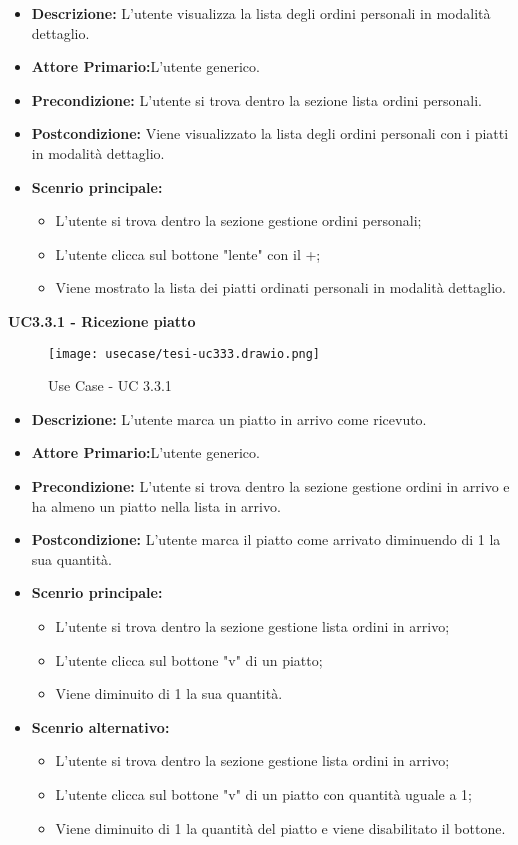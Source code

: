 \begin{itemize}
    \item \textbf{Descrizione:} L'utente visualizza la lista degli ordini personali in modalità dettaglio.
    \item \textbf{Attore Primario:}L'utente generico.
    \item \textbf{Precondizione:} L'utente si trova dentro la sezione lista ordini personali.
    \item \textbf{Postcondizione:} Viene visualizzato la lista degli ordini personali con i piatti in modalità dettaglio.
    \item \textbf{Scenrio principale:}
    \begin{itemize}
        \item L'utente si trova dentro la sezione gestione ordini personali;
        \item L'utente clicca sul bottone "lente" con il +;
        \item Viene mostrato la lista dei piatti ordinati personali in modalità dettaglio.
    \end{itemize}
\end{itemize}
\textbf{UC3.3.1 - Ricezione piatto}
\begin{figure}[H]
    \centering
    \texttt{[image: usecase/tesi-uc333.drawio.png]}
    \caption{Use Case - UC 3.3.1}
\end{figure}
\begin{itemize}
    \item \textbf{Descrizione:} L'utente marca un piatto in arrivo come ricevuto.
    \item \textbf{Attore Primario:}L'utente generico.
    \item \textbf{Precondizione:} L'utente si trova dentro la sezione gestione ordini in arrivo e ha almeno un piatto nella lista in arrivo.
    \item \textbf{Postcondizione:} L'utente marca il piatto come arrivato diminuendo di 1 la sua quantità.
    \item \textbf{Scenrio principale:}
    \begin{itemize}
        \item L'utente si trova dentro la sezione gestione lista ordini in arrivo;
        \item L'utente clicca sul bottone "v" di un piatto;
        \item Viene diminuito di 1 la sua quantità.
    \end{itemize}
    \item \textbf{Scenrio alternativo:}
    \begin{itemize}
        \item L'utente si trova dentro la sezione gestione lista ordini in arrivo;
        \item L'utente clicca sul bottone "v" di un piatto con quantità uguale a 1;
        \item Viene diminuito di 1 la quantità del piatto e viene disabilitato il bottone.
    \end{itemize}
\end{itemize}


